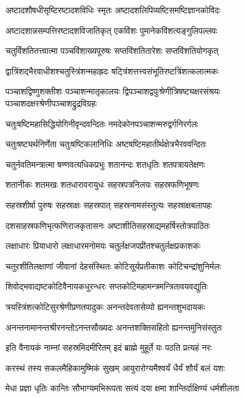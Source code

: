 \twolineshloka
{अष्टादशौषधीसृष्टिरष्टादशविधिः स्मृतः}
{अष्टादशलिपिव्यष्टिसमष्टिज्ञानकोविदः}

\twolineshloka
{अष्टादशान्नसम्पत्तिरष्टादशविजातिकृत्}
{एकविंशः पुमानेकविंशत्यङ्गुलिपल्लवः}

\twolineshloka
{चतुर्विंशतितत्त्वात्मा पञ्चविंशाख्यपूरुषः}
{सप्तविंशतितारेशः सप्तविंशतियोगकृत्}

\twolineshloka
{द्वात्रिंशद्भैरवाधीशश्चतुस्त्रिंशन्महाह्रदः}
{षट्त्रिंशत्तत्त्वसंभूतिरष्टत्रिंशत्कलात्मकः}

\threelineshloka
{पञ्चाशद्विष्णुशक्तीशः पञ्चाशन्मातृकालयः}
{द्विपञ्चाशद्वपुःश्रेणीत्रिषष्ट्यक्षरसंश्रयः}
{पञ्चाशदक्षरश्रेणीपञ्चाशद्रुद्रविग्रहः}

\twolineshloka
{चतुःषष्टिमहासिद्धियोगिनीवृन्दवन्दितः}
{नमदेकोनपञ्चाशन्मरुद्वर्गनिरर्गलः}

\twolineshloka
{चतुःषष्ट्यर्थनिर्णेता चतुःषष्टिकलानिधिः}
{अष्टषष्टिमहातीर्थक्षेत्रभैरववन्दितः}

\twolineshloka
{चतुर्नवतिमन्त्रात्मा षण्णवत्यधिकप्रभुः}
{शतानन्दः शतधृतिः शतपत्रायतेक्षणः}

\twolineshloka
{शतानीकः शतमखः शतधारावरायुधः}
{सहस्रपत्रनिलयः सहस्रफणिभूषणः}

\twolineshloka
{सहस्रशीर्षा पुरुषः सहस्राक्षः सहस्रपात्}
{सहस्रनामसंस्तुत्यः सहस्राक्षबलापहः}

\twolineshloka
{दशसाहस्रफणिभृत्फणिराजकृतासनः}
{अष्टाशीतिसहस्राद्यमहर्षिस्तोत्रपाठितः}

\twolineshloka
{लक्षाधारः प्रियाधारो लक्षाधारमनोमयः}
{चतुर्लक्षजपप्रीतश्चतुर्लक्षप्रकाशकः}

\twolineshloka
{चतुरशीतिलक्षाणां जीवानां देहसंस्थितः}
{कोटिसूर्यप्रतीकाशः कोटिचन्द्रांशुनिर्मलः}

\twolineshloka
{शिवोद्भवाद्यष्टकोटिवैनायकधुरन्धरः}
{सप्तकोटिमहामन्त्रमन्त्रितावयवद्युतिः}

\twolineshloka
{त्रयस्त्रिंशत्कोटिसुरश्रेणीप्रणतपादुकः}
{अनन्तदेवतासेव्यो ह्यनन्तशुभदायकः}

\twolineshloka
{अनन्तनामानन्तश्रीरनन्तोऽनन्तसौख्यदः}
{अनन्तशक्तिसहितो ह्यनन्तमुनिसंस्तुतः}

\twolineshloka
{इति वैनायकं नाम्नां सहस्रमिदमीरितम्}
{इदं ब्राह्मे मुहूर्ते यः पठति प्रत्यहं नरः}

\twolineshloka
{करस्थं तस्य सकलमैहिकामुष्मिकं सुखम्}
{आयुरारोग्यमैश्वर्यं धैर्यं शौर्यं बलं यशः}

\twolineshloka
{मेधा प्रज्ञा धृतिः कान्तिः सौभाग्यमभिरूपता}
{सत्यं दया क्षमा शान्तिर्दाक्षिण्यं धर्मशीलता}


